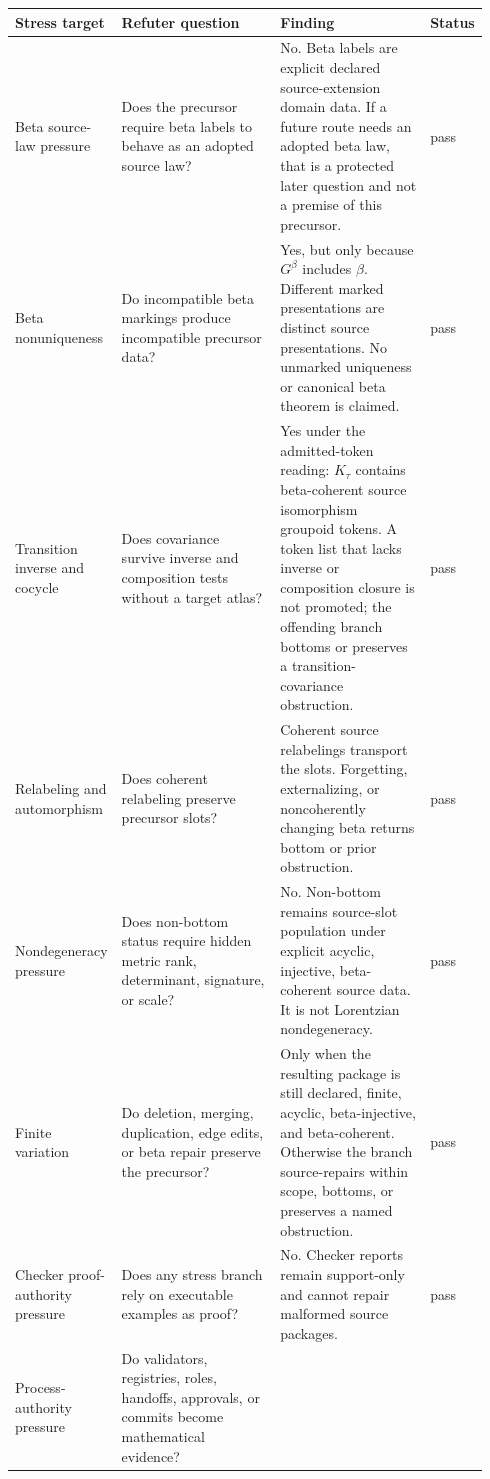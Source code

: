 \documentclass[11pt]{article}
\newcommand{\Gbeta}{G^\beta}
\newcommand{\Ktau}{K_\tau}
\begin{document}
\begin{longtable}{p{0.20\linewidth}p{0.34\linewidth}p{0.32\linewidth}p{0.08\linewidth}}
\toprule
Stress target & Refuter question & Finding & Status \\
\midrule
Beta source-law pressure &
Does the precursor require beta labels to behave as an adopted source law? &
No. Beta labels are explicit declared source-extension domain data. If a
future route needs an adopted beta law, that is a protected later question and
not a premise of this precursor. &
pass \\
Beta nonuniqueness &
Do incompatible beta markings produce incompatible precursor data? &
Yes, but only because \(\Gbeta\) includes \(\beta\). Different marked
presentations are distinct source presentations. No unmarked uniqueness or
canonical beta theorem is claimed. &
pass \\
Transition inverse and cocycle &
Does covariance survive inverse and composition tests without a target atlas? &
Yes under the admitted-token reading: \(\Ktau\) contains beta-coherent source
isomorphism groupoid tokens. A token list that lacks inverse or composition
closure is not promoted; the offending branch bottoms or preserves a
transition-covariance obstruction. &
pass \\
Relabeling and automorphism &
Does coherent relabeling preserve precursor slots? &
Coherent source relabelings transport the slots. Forgetting, externalizing, or
noncoherently changing beta returns bottom or prior obstruction. &
pass \\
Nondegeneracy pressure &
Does non-bottom status require hidden metric rank, determinant, signature, or
scale? &
No. Non-bottom remains source-slot population under explicit acyclic,
injective, beta-coherent source data. It is not Lorentzian nondegeneracy. &
pass \\
Finite variation &
Do deletion, merging, duplication, edge edits, or beta repair preserve the
precursor? &
Only when the resulting package is still declared, finite, acyclic,
beta-injective, and beta-coherent. Otherwise the branch source-repairs within
scope, bottoms, or preserves a named obstruction. &
pass \\
Checker proof-authority pressure &
Does any stress branch rely on executable examples as proof? &
No. Checker reports remain support-only and cannot repair malformed source
packages. &
pass \\
Process-authority pressure &
Do validators, registries, roles, handoffs, approvals, or commits become
mathematical evidence? &

\end{longtable}
\end{document}
